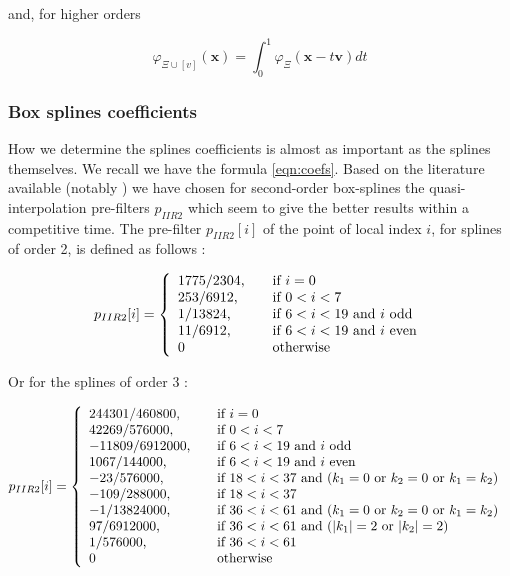 \documentclass[proc]{edpsmath}
\begin{document}
and, for higher orders

\begin{equation} \label{eqn:boxsplines_basis}
\varphi_{\Xi \cup [v]}(\mathbf{x}) = \int_0^ 1 \varphi_\Xi(\mathbf{x}-t\mathbf{v})dt
\end{equation}

\subsubsection{Box splines coefficients}

How we determine the splines coefficients is almost as important as the splines themselves. We recall we have the formula \eqref{eqn:coefs}. Based on the literature available (notably \cite{Condat2007}) we have chosen for second-order box-splines the quasi-interpolation pre-filters $p_{IIR2}$ which seem to give the better results within a competitive time. The pre-filter $p_{IIR2}[i]$ of the point of local index $i$, for splines of order 2, is defined as follows : 


\begin{equation}
\label{eqn:filterIIR2}
p_{IIR2} [i] = \left\{
  \begin{array}{l l}
    1775/2304\text{,} & \quad \text{if } i = 0\\
    253/6912\text{,} & \quad \text{if } 0<i<7\\
    1/13824\text{,} & \quad \text{if } 6<i<19 \text{ and $i$ odd}\\
    11/6912\text{,} & \quad \text{if } 6<i<19 \text{ and $i$ even}\\
    0 & \quad \text{otherwise}
  \end{array} \right.
\end{equation}

Or for the splines of order 3 :

\begin{equation}
\label{eqn:filterIIR3}
p_{IIR2} [i] = \left\{
  \begin{array}{l l}
    244301/460800\text{,} & \quad \text{if } i = 0\\
    42269/576000\text{,} & \quad \text{if } 0<i<7\\
    -11809/6912000\text{,} & \quad \text{if } 6<i<19 \text{ and $i$ odd}\\
    1067/144000\text{,} & \quad \text{if } 6<i<19 \text{ and $i$ even}\\
    -23/576000\text{,} & \quad \text{if } 18<i<37 \text{ and ($k_1 = 0$ or $k_2 = 0$ or $k_1 = k_2$) }\\
    -109/288000\text{,} & \quad \text{if } 18<i<37 \\
    	-1/13824000\text{,} & \quad \text{if } 36<i<61 \text{ and ($k_1 = 0$ or $k_2 = 0$ or $k_1 = k_2$) }\\
    	97/6912000\text{,} & \quad \text{if } 36<i<61 \text{ and ($|k_1| = 2$ or $|k_2| = 2$) }\\
    	1/576000\text{,} & \quad \text{if } 36<i<61\\    		
    0 & \quad \text{otherwise}
  \end{array} \right.
\end{equation}
\end{document}
